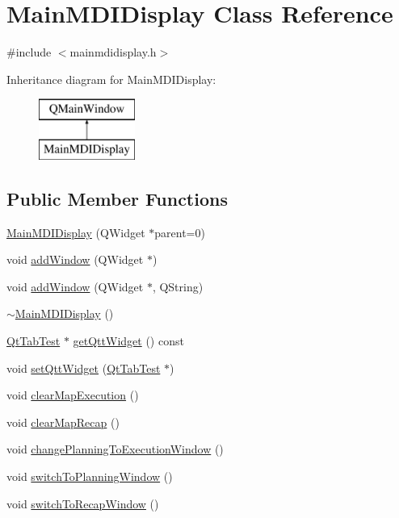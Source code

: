 \hypertarget{class_main_m_d_i_display}{}\section{Main\+M\+D\+I\+Display Class Reference}
\label{class_main_m_d_i_display}


{\ttfamily \#include $<$mainmdidisplay.\+h$>$}

Inheritance diagram for Main\+M\+D\+I\+Display\+:\begin{figure}[H]
\begin{center}
\leavevmode
\includegraphics[height=2.000000cm]{class_main_m_d_i_display}
\end{center}
\end{figure}
\subsection*{Public Member Functions}
\begin{DoxyCompactItemize}
\item 
\hyperlink{class_main_m_d_i_display_a782ef2721fdd8b24924ce87dc66bb55c}{Main\+M\+D\+I\+Display} (Q\+Widget $\ast$parent=0)
\item 
void \hyperlink{class_main_m_d_i_display_a527f8ff5bc9f78afb09376ac862a1f34}{add\+Window} (Q\+Widget $\ast$)
\item 
void \hyperlink{class_main_m_d_i_display_a0ca1499c42b7428014519897ed528c32}{add\+Window} (Q\+Widget $\ast$, Q\+String)
\item 
\hyperlink{class_main_m_d_i_display_abeda7bf528423b91f8bc9c3b6873795e}{$\sim$\+Main\+M\+D\+I\+Display} ()
\item 
\hyperlink{class_qt_tab_test}{Qt\+Tab\+Test} $\ast$ \hyperlink{class_main_m_d_i_display_a25d070683b2dbc80d15629af962dd504}{get\+Qtt\+Widget} () const 
\item 
void \hyperlink{class_main_m_d_i_display_a0bd367883842e6f0069181b566690490}{set\+Qtt\+Widget} (\hyperlink{class_qt_tab_test}{Qt\+Tab\+Test} $\ast$)
\item 
void \hyperlink{class_main_m_d_i_display_ae5a5bb272b564517870daf9703e83fca}{clear\+Map\+Execution} ()
\item 
void \hyperlink{class_main_m_d_i_display_a2499cb8a6c4c56d49b7785546a044d35}{clear\+Map\+Recap} ()
\item 
void \hyperlink{class_main_m_d_i_display_a0a08ba2f51e573f0161784e3d9c03b41}{change\+Planning\+To\+Execution\+Window} ()
\item 
void \hyperlink{class_main_m_d_i_display_a437506b2ebd8b9789381a0b48a1b81a3}{switch\+To\+Planning\+Window} ()
\item 
void \hyperlink{class_main_m_d_i_display_ad46e5bb590735c32ec79d192ffbd5244}{switch\+To\+Recap\+Window} ()
\end{DoxyCompactItemize}


